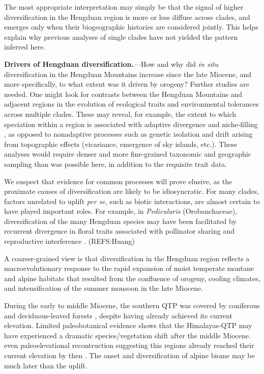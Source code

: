 The most appropriate interpretation may simply be that the signal of higher diversification in the Hengduan region is more or less diffuse across clades, and emerges only when their biogeographic histories are considered jointly. This helps explain why previous analyses of single clades have not yielded the pattern inferred here.

\textbf{Drivers of Hengduan diversification.}---How and why did \textit{in situ} diversification in the Hengduan Mountains increase since the late Miocene, and more specifically, to what extent was it driven by orogeny? Further studies are needed. One might look for contrasts between the Hengduan Mountains and adjacent regions in the evolution of ecological traits and environmental tolerances \citep[e.g.,][]{liu2016} across multiple clades. These may reveal, for example, the extent to which speciation within a region is associated with adaptive divergence and niche-filling \citep{price2014}, as opposed to nonadaptive processes such as genetic isolation and drift arising from topographic effects (vicariance, emergence of sky islands, etc.). These analyses would require denser and more fine-grained taxonomic and geographic sampling than was possible here, in addition to the requisite trait data.



We suspect that evidence for common processes will prove elusive, as the proximate causes of diversification are likely to be idiosyncratic. For many clades, factors unrelated to uplift \emph{per se}, such as biotic interactions, are almost certain to have played important roles. For example, in \emph{Pedicularis} (Orobanchaceae), diversification of the many Hengduan species may have been facilitated by recurrent divergence in floral traits associated with pollinator sharing and reproductive interference \citep[e.g.,][]{eaton2012}. (REFS:Huang)

A coarser-grained view is that diversification in the Hengduan region reflects a macroevolutionary response to the rapid expansion of moist temperate montane and alpine habitats that resulted from the confluence of orogeny, cooling climates, and intensification of the summer monsoon in the late Miocene.

During the early to middle Miocene, the southern QTP was covered by coniferous and deciduous-leaved forests \citep{SunJ2014,LiH1976}, despite having already achieved its current elevation. Limited paleobotanical evidence shows that the Himalayas-QTP may have experienced a dramatic species/vegetation shift after the middle Miocene. even paleoelevational recontruction suggesting this regions already reached their current elevation by then \citep{Spicer2003}. The onset and diversification of alpine biome may be much later than the uplift.

